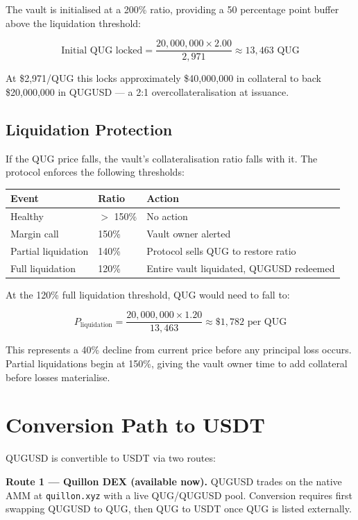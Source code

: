 \documentclass[11pt,a4paper]{article}
\begin{document}
The vault is initialised at a 200\% ratio, providing a 50 percentage point
buffer above the liquidation threshold:

\[
  \text{Initial QUG locked} = \frac{20{,}000{,}000 \times 2.00}{2{,}971}
  \approx 13{,}463 \text{ QUG}
\]

At \$2,971/QUG this locks approximately \$40,000,000 in collateral to back
\$20,000,000 in QUGUSD — a 2:1 overcollateralisation at issuance.

\subsection{Liquidation Protection}

If the QUG price falls, the vault's collateralisation ratio falls with it.
The protocol enforces the following thresholds:

\begin{center}
\begin{tabular}{lll}
\toprule
\textbf{Event} & \textbf{Ratio} & \textbf{Action} \\
\midrule
Healthy          & $>$ 150\% & No action \\
Margin call      & 150\%     & Vault owner alerted \\
Partial liquidation & 140\% & Protocol sells QUG to restore ratio \\
Full liquidation    & 120\% & Entire vault liquidated, QUGUSD redeemed \\
\bottomrule
\end{tabular}
\end{center}

At the 120\% full liquidation threshold, QUG would need to fall to:

\[
  P_{\text{liquidation}} = \frac{20{,}000{,}000 \times 1.20}{13{,}463}
  \approx \$1{,}782 \text{ per QUG}
\]

This represents a 40\% decline from current price before any principal loss
occurs. Partial liquidations begin at 150\%, giving the vault owner time to
add collateral before losses materialise.

\section{Conversion Path to USDT}

QUGUSD is convertible to USDT via two routes:

\textbf{Route 1 — Quillon DEX (available now).}
QUGUSD trades on the native AMM at \texttt{quillon.xyz} with a live
QUG/QUGUSD pool. Conversion requires first swapping QUGUSD to QUG,
then QUG to USDT once QUG is listed externally.
\end{document}
